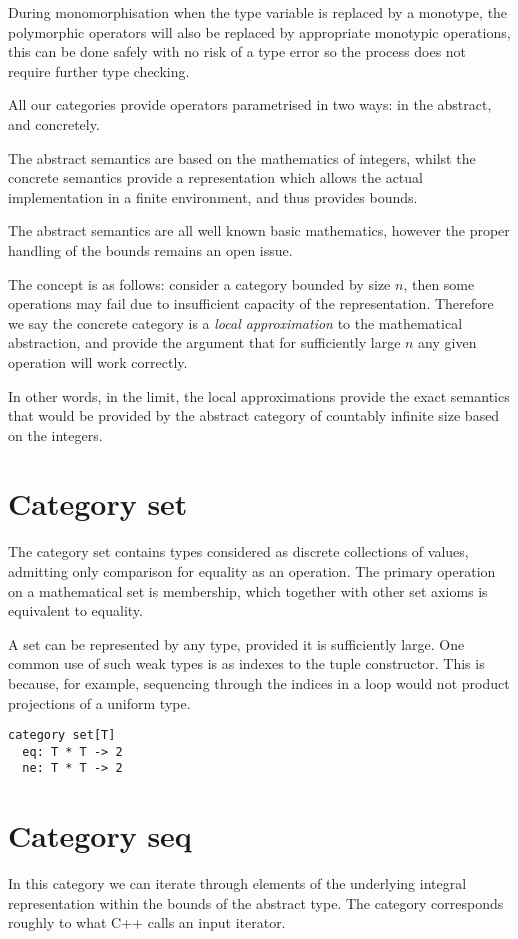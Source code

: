\documentclass[oneside]{book}
\theoremstyle{plain}
\theoremstyle{definition}
\theoremstyle{plain}
\begin{document}
During monomorphisation when the type variable is replaced by a monotype,
the polymorphic operators will also be replaced by appropriate monotypic
operations, this can be done safely with no risk of a type error so
the process does not require further type checking.

All our categories provide operators parametrised in two ways:
in the abstract, and concretely.

The abstract semantics are based on the mathematics of integers,
whilst the concrete semantics provide a representation which
allows the actual implementation in a finite environment,
and thus provides bounds.

The abstract semantics are all well known basic mathematics,
however the proper handling of the bounds remains an open issue.

The concept is as follows: consider a category bounded by size $n$,
then some operations may fail due to insufficient capacity of
the representation. Therefore we say the concrete category is 
a {\em local approximation} to the mathematical abstraction,
and provide the argument that for sufficiently large $n$ any
given operation will work correctly.

In other words, in the limit, the local approximations provide
the exact semantics that would be provided by the abstract category
of countably infinite size based on the integers.

\section{Category set}
The category set contains types considered as discrete collections
of values, admitting only comparison for equality as an operation.
The primary operation on a mathematical set is membership, which together
with other set axioms is equivalent to equality.

A set can be represented by any type, provided it is sufficiently large.
One common use of such weak types is as indexes to the tuple constructor.
This is because, for example, sequencing through the indices in a loop
would not product projections of a uniform type.

\begin{verbatim}
category set[T]
  eq: T * T -> 2
  ne: T * T -> 2
\end{verbatim}

\section{Category seq}
In this category we can iterate through elements of the underlying
integral representation within the bounds of the abstract type.
The category corresponds roughly to what C++ calls an input iterator.
\end{document}
